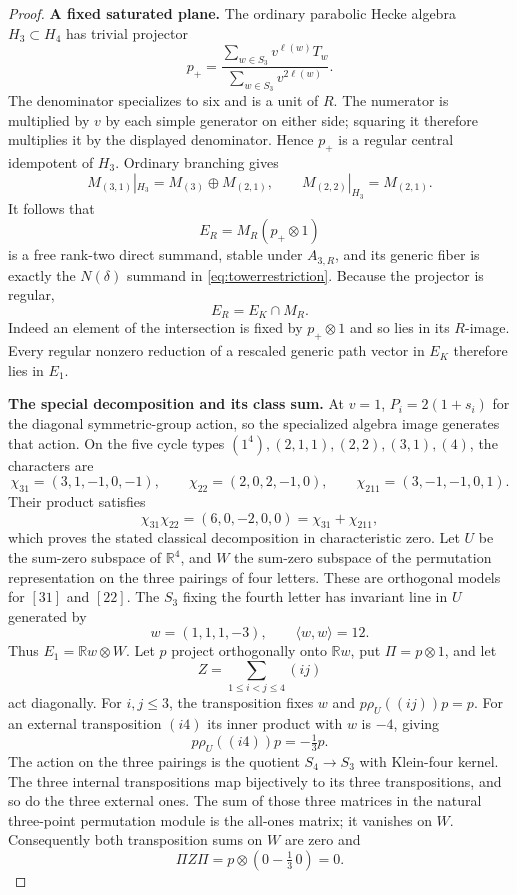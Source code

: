 \documentclass[11pt,a4paper]{article}
\theoremstyle{named}\newtheorem{finding}{Finding}[section]
\theoremstyle{definition}\newtheorem{definition}[finding]{Definition}
\theoremstyle{remark}\newtheorem{remark}[finding]{Remark}
\begin{document}
\begin{proof}
\par\smallskip\noindent\textbf{A fixed saturated plane.}\quad
The ordinary parabolic Hecke algebra $H_3\subset H_4$ has trivial
projector
\[
 p_+=\frac{\sum_{w\in S_3}v^{\ell(w)}T_w}
              {\sum_{w\in S_3}v^{2\ell(w)}}.
\]
The denominator specializes to six and is a unit of $R$. The numerator
is multiplied by $v$ by each simple generator on either side; squaring
it therefore multiplies it by the displayed denominator. Hence $p_+$
is a regular central idempotent of $H_3$. Ordinary branching gives
\[
 M_{(3,1)}|_{H_3}=M_{(3)}\oplus M_{(2,1)},\qquad
 M_{(2,2)}|_{H_3}=M_{(2,1)}.
\]
It follows that
\[
 E_R=M_R(p_+\otimes1)
\]
is a free rank-two direct summand, stable under $A_{3,R}$, and its
generic fiber is exactly the $N(\delta)$ summand in
\eqref{eq:towerrestriction}. Because the projector is regular,
\begin{equation}\label{eq:towersaturated}
 E_R=E_K\cap M_R.
\end{equation}
Indeed an element of the intersection is fixed by $p_+\otimes1$
and so lies in its $R$-image. Every regular nonzero reduction of a
rescaled generic path vector in $E_K$ therefore lies in $E_1$.

\par\smallskip\noindent\textbf{The special decomposition and its class sum.}\quad
At $v=1$, $P_i=2(1+s_i)$ for the diagonal symmetric-group action,
so the specialized algebra image generates that action. On the five
cycle types $(1^4),(2,1,1),(2,2),(3,1),(4)$, the characters are
\[
 \chi_{31}=(3,1,-1,0,-1),\qquad
 \chi_{22}=(2,0,2,-1,0),\qquad
 \chi_{211}=(3,-1,-1,0,1).
\]
Their product satisfies
\[
 \chi_{31}\chi_{22}=(6,0,-2,0,0)=\chi_{31}+\chi_{211},
\]
which proves the stated classical decomposition in characteristic zero.
Let $U$ be the sum-zero subspace of $\mathbb R^4$, and $W$ the
sum-zero subspace of the permutation representation on the three
pairings of four letters. These are orthogonal models for $[31]$
and $[22]$. The $S_3$ fixing the fourth letter has invariant line
in $U$ generated by
\[
 w=(1,1,1,-3),\qquad \langle w,w\rangle=12.
\]
Thus $E_1=\mathbb Rw\otimes W$. Let $p$ project orthogonally onto
$\mathbb Rw$, put $\Pi=p\otimes1$, and let
\[
 Z=\sum_{1\le i<j\le4}(ij)
\]
act diagonally. For $i,j\le3$, the transposition fixes $w$ and
$p\rho_U((ij))p=p$. For an external transposition $(i4)$ its inner
product with $w$ is $-4$, giving
\[
 p\rho_U((i4))p=-\tfrac13p.
\]
The action on the three pairings is the quotient $S_4\to S_3$ with
Klein-four kernel. The three internal transpositions map bijectively
to its three transpositions, and so do the three external ones.
The sum of those three matrices in the natural three-point
permutation module is the all-ones matrix; it vanishes on $W$.
Consequently both transposition sums on $W$ are zero and
\begin{equation}\label{eq:towercompression}
 \Pi Z\Pi=p\otimes(0-\tfrac13\,0)=0.
\end{equation}


\end{proof}
\end{document}

